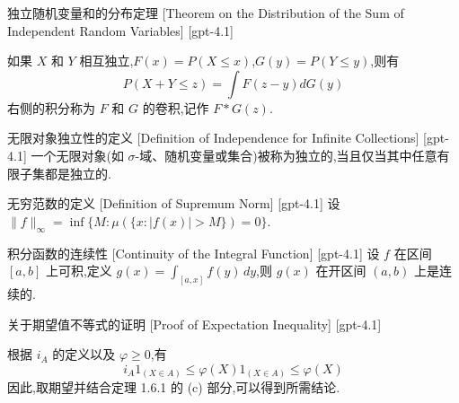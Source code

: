 \documentclass[UTF8]{ctexart}
\begin{document}
    
    
    \begin{thm}
        {独立随机变量和的分布定理}
        [Theorem on the Distribution of the Sum of Independent Random Variables]
        [gpt-4.1]
        
如果 $X$ 和 $Y$ 相互独立,$F(x) = P(X \leq x)$,$G(y) = P(Y \leq y)$,则有
\[
P(X + Y \leq z) = \int F(z - y) dG(y)
\]
右侧的积分称为 $F$ 和 $G$ 的卷积,记作 $F * G(z)$.

    \end{thm}
    
    
    
    \begin{dfn}
        {无限对象独立性的定义}
        [Definition of Independence for Infinite Collections]
        [gpt-4.1]
        一个无限对象(如 $\sigma$-域、随机变量或集合)被称为独立的,当且仅当其中任意有限子集都是独立的.
    \end{dfn}
    
    
    
    \begin{dfn}
        {无穷范数的定义}
        [Definition of Supremum Norm]
        [gpt-4.1]
        设 $\| f \|_{\infty} = \inf \{ M : \mu( \{ x : |f(x)| > M \} ) = 0 \}$.
    \end{dfn}
    
    
    
    \begin{thm}
        {积分函数的连续性}
        [Continuity of the Integral Function]
        [gpt-4.1]
        设 $f$ 在区间 $[a, b]$ 上可积,定义 $g(x) = \int_{[a, x]} f(y) \, dy$,则 $g(x)$ 在开区间 $(a, b)$ 上是连续的.
    \end{thm}
    
    
    
    \begin{prf}
        {关于期望值不等式的证明}
        [Proof of Expectation Inequality]
        [gpt-4.1]
        
根据 $i_{A}$ 的定义以及 $\varphi \geq 0$,有
\[
i_{A} 1_{(X \in A)} \leq \varphi(X) 1_{(X \in A)} \leq \varphi(X)
\]
因此,取期望并结合定理 1.6.1 的 (c) 部分,可以得到所需结论.

    \end{prf}
    
\end{document}
